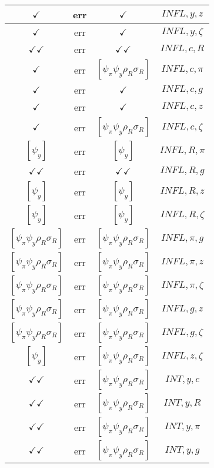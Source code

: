 \documentclass[a4paper,10pt]{article}
\begin{document}
\begin{longtable}{|c|c|c|c|}
\hline
$\checkmark$ & err & $\checkmark$ & ${INFL},{y},{z}$ \\
\hline
$\checkmark$ & err & $\checkmark$ & ${INFL},{y},{\zeta}$ \\
\hline
$\checkmark\checkmark$ & err & $\checkmark\checkmark$ & ${INFL},{c},{R}$ \\
\hline
$\checkmark$ & err & $[\psi_\pi \psi_y \rho_R \sigma_R ]$ & ${INFL},{c},{\pi}$ \\
\hline
$\checkmark$ & err & $\checkmark$ & ${INFL},{c},{g}$ \\
\hline
$\checkmark$ & err & $\checkmark$ & ${INFL},{c},{z}$ \\
\hline
$\checkmark$ & err & $[\psi_\pi \psi_y \rho_R \sigma_R ]$ & ${INFL},{c},{\zeta}$ \\
\hline
$[\psi_y ]$ & err & $[\psi_y ]$ & ${INFL},{R},{\pi}$ \\
\hline
$\checkmark\checkmark$ & err & $\checkmark\checkmark$ & ${INFL},{R},{g}$ \\
\hline
$[\psi_y ]$ & err & $[\psi_y ]$ & ${INFL},{R},{z}$ \\
\hline
$[\psi_y ]$ & err & $[\psi_y ]$ & ${INFL},{R},{\zeta}$ \\
\hline
$[\psi_\pi \psi_y \rho_R \sigma_R ]$ & err & $[\psi_\pi \psi_y \rho_R \sigma_R ]$ & ${INFL},{\pi},{g}$ \\
\hline
$[\psi_\pi \psi_y \rho_R \sigma_R ]$ & err & $[\psi_\pi \psi_y \rho_R \sigma_R ]$ & ${INFL},{\pi},{z}$ \\
\hline
$[\psi_\pi \psi_y \rho_R \sigma_R ]$ & err & $[\psi_\pi \psi_y \rho_R \sigma_R ]$ & ${INFL},{\pi},{\zeta}$ \\
\hline
$[\psi_\pi \psi_y \rho_R \sigma_R ]$ & err & $[\psi_\pi \psi_y \rho_R \sigma_R ]$ & ${INFL},{g},{z}$ \\
\hline
$[\psi_\pi \psi_y \rho_R \sigma_R ]$ & err & $[\psi_\pi \psi_y \rho_R \sigma_R ]$ & ${INFL},{g},{\zeta}$ \\
\hline
$[\psi_y ]$ & err & $[\psi_\pi \psi_y \rho_R \sigma_R ]$ & ${INFL},{z},{\zeta}$ \\
\hline
$\checkmark\checkmark$ & err & $[\psi_\pi \psi_y \rho_R \sigma_R ]$ & ${INT},{y},{c}$ \\
\hline
$\checkmark\checkmark$ & err & $[\psi_\pi \psi_y \rho_R \sigma_R ]$ & ${INT},{y},{R}$ \\
\hline
$\checkmark\checkmark$ & err & $[\psi_\pi \psi_y \rho_R \sigma_R ]$ & ${INT},{y},{\pi}$ \\
\hline
$\checkmark\checkmark$ & err & $[\psi_\pi \psi_y \rho_R \sigma_R ]$ & ${INT},{y},{g}$ \\

\end{longtable}
\end{document}
